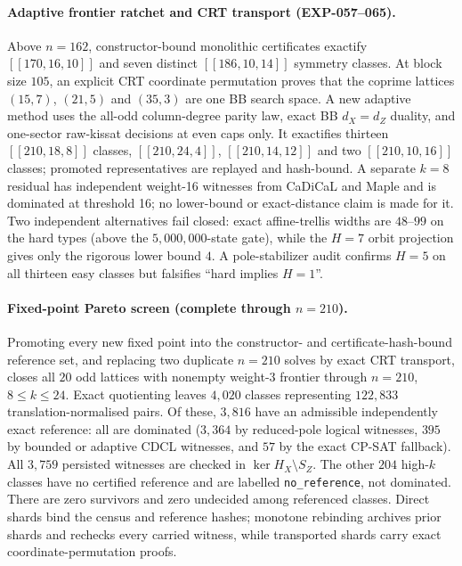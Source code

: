 \documentclass[11pt]{article}
\newcommand{\nk}[1]{[\![#1]\!]}
\theoremstyle{plain}
\theoremstyle{remark}
\begin{document}
\paragraph{Adaptive frontier ratchet and CRT transport (EXP-057--065).}
Above $n=162$, constructor-bound monolithic certificates exactify
$\nk{170,16,10}$ and seven distinct $\nk{186,10,14}$ symmetry classes.
At block size $105$, an explicit CRT coordinate permutation proves that the
coprime lattices $(15,7)$, $(21,5)$ and $(35,3)$ are one BB search space.
A new adaptive method uses the all-odd column-degree parity law, exact BB
$d_X=d_Z$ duality, and one-sector raw-kissat decisions at even caps only.
It exactifies thirteen $\nk{210,18,8}$ classes, $\nk{210,24,4}$,
$\nk{210,14,12}$ and two $\nk{210,10,16}$ classes; promoted representatives
are replayed and hash-bound. A separate $k=8$ residual has independent
weight-16 witnesses from CaDiCaL and Maple and is dominated at threshold 16;
no lower-bound or exact-distance claim is made for it. Two independent
alternatives fail closed: exact affine-trellis widths are $48$--$99$ on the
hard types (above the $5{,}000{,}000$-state gate), while the $H=7$ orbit
projection gives only the rigorous lower bound $4$. A pole-stabilizer audit
confirms $H=5$ on all thirteen easy classes but falsifies ``hard implies
$H=1$''.

\paragraph{Fixed-point Pareto screen (complete through $n=210$).}
Promoting every new fixed point into the constructor- and certificate-hash-bound
reference set, and replacing two duplicate $n=210$ solves by exact CRT
transport, closes all $20$ odd lattices with nonempty weight-3 frontier through
$n=210$, $8\le k\le24$. Exact quotienting leaves $4{,}020$ classes
representing $122{,}833$ translation-normalised pairs. Of these, $3{,}816$
have an admissible independently exact reference: all are dominated
($3{,}364$ by reduced-pole logical witnesses, $395$ by bounded or adaptive
CDCL witnesses, and $57$ by the exact CP-SAT fallback). All $3{,}759$
persisted witnesses are checked in $\ker H_X\setminus S_Z$. The other $204$
high-$k$ classes have no certified reference and are labelled
\texttt{no\_reference}, not dominated. There are zero survivors and zero
undecided among referenced classes. Direct shards bind the census and reference
hashes; monotone rebinding archives prior shards and rechecks every carried
witness, while transported shards carry exact coordinate-permutation proofs.
\end{document}
